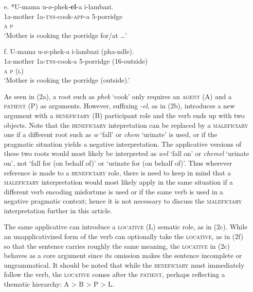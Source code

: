 \documentclass[output=paper]{langsci/langscibook}
\begin{document}
\gll   e.  *U-mama  u-ø-phek-\textbf{el}{}-a       i-lambazi.\\
         1a-mother  1a-\textsc{tns}{}-cook-\textsc{app}{}-a  5-porridge \\
         \textsc{a                  p}\\
\glt     ‘Mother is cooking the porridge for/at …’
\z

\gll   f.  U-mama       u-ø-phek-a    i-lambazi  (pha-ndle).\\
         1a-mother    1a-\textsc{tns}{}-cook-a  5-porridge  (16-outside)\\
         \textsc{a                p      (l)}\\
\glt     ‘Mother is cooking the porridge (outside).’
\z

As seen in (2a), a root such as \textit{phek} ‘cook’ only requires an \textsc{agent} (A) and a \textsc{patient} (P) as arguments. However, suffixing \textit{{}-el}, as in (2b), introduces a new argument with a \textsc{beneficiary} (B) participant role and the verb ends up with two objects. Note that the \textsc{beneficiary} intepretation can be replaced by a \textsc{maleficiary} one if a different root such as \textit{w} ‘fall’ or \textit{chem} ‘urinate’ is used, or if the pragmatic situation yields a negative interpretation.  The applicative versions of these two roots would most likely be interpreted as \textit{wel} ‘fall on’ or \textit{chemel} ‘urinate on’, not ‘fall for (on behalf of)’ or ‘urinate for (on behalf of)’. Thus wherever reference is made to a \textsc{beneficiary} role, there is need to keep in mind that a \textsc{maleficiary} interpretation would most likely apply in the same situation if a different verb encoding misfortune is used or if the same verb is used in a negative pragmatic context; hence it is not necessary to discuss the \textsc{maleficiary} interpretation further in this article. 

  The same applicative can introduce a \textsc{locative} (L) sematic role, as in (2c). While an unapplicativized form of the verb can optionally take the \textsc{locative}, as in (2f) so that the sentence carries roughly the same meaning, the \textsc{locative} in (2c) behaves as a core argument since its omission makes the sentence incomplete or ungrammatical. It should be noted that while the \textsc{beneficiary} must immediately follow the verb, the \textsc{locative} comes after the \textsc{patient}\textit{,} perhaps reflecting a thematic hierarchy:  A {\textgreater} B {\textgreater} P {\textgreater} L.  
\end{document}
